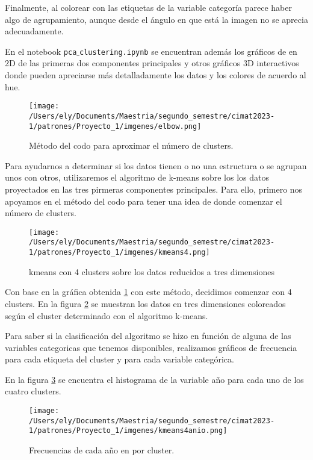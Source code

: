 \documentclass[letterpaper,spanish,reprint,nofootinbib,showkeys,aps]{revtex4-2}
\begin{document}
Finalmente, al colorear con las etiquetas de la variable categoría parece haber algo de agrupamiento, aunque desde el ángulo en que está la imagen no se aprecia adecuadamente.

En el notebook \texttt{pca$\_$clustering.ipynb} se encuentran además los gráficos de en 2D de las primeras dos componentes principales y otros gráficos 3D interactivos donde pueden apreciarse más detalladamente los datos y los colores de acuerdo al hue. 



\begin{figure} [H]
	\begin{center}
		\texttt{[image: /Users/ely/Documents/Maestria/segundo\_semestre/cimat2023-1/patrones/Proyecto\_1/imgenes/elbow.png]}
		\caption{Método del codo para aproximar el número de clusters.}
		\label{elbow} 
   \end{center} 
\end{figure} 



Para ayudarnos a determinar si los datos tienen o no una estructura o se agrupan unos con otros, utilizaremos el algoritmo de k-means sobre los los datos proyectados en las tres pirmeras componentes principales. Para ello, primero nos apoyamos en el método del codo para tener una idea de donde comenzar el número de clusters.


\begin{figure} [H]
	\begin{center}
		\texttt{[image: /Users/ely/Documents/Maestria/segundo\_semestre/cimat2023-1/patrones/Proyecto\_1/imgenes/kmeans4.png]}
		\caption{kmeans con 4 clusters sobre los datos reducidos a tres dimensiones}
		\label{kmeans4} 
   \end{center} 
\end{figure} 

Con base en la gráfica obtenida \ref{elbow}  con este método, decidimos comenzar con 4 clusters. En la figura \ref{kmeans4} se muestran los datos en tres dimensiones coloreados según el cluster determinado con el algoritmo k-means. 


Para saber si la clasificación del algoritmo se hizo en función de alguna de las variables categoricas que tenemos disponibles, realizamos gráficos de frecuencia para cada etiqueta del cluster y para cada variable categórica.

En la figura \ref{kmeans4anio} se encuentra el histograma de la variable año para cada uno de los cuatro clusters.
\begin{figure} [H]
	\begin{center}
		\texttt{[image: /Users/ely/Documents/Maestria/segundo\_semestre/cimat2023-1/patrones/Proyecto\_1/imgenes/kmeans4anio.png]}
		\caption{Frecuencias de cada año en por cluster. }
		\label{kmeans4anio} 
   \end{center} 
\end{figure} 
\end{document}
